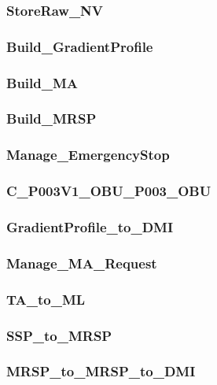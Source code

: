 \subsubsection{StoreRaw\_NV}


\subsubsection{Build\_GradientProfile}


\subsubsection{Build\_MA}


\subsubsection{Build\_MRSP}


\subsubsection{Manage\_EmergencyStop}


\subsubsection{C\_P003V1\_OBU\_P003\_OBU}


\subsubsection{GradientProfile\_to\_DMI}


\subsubsection{Manage\_MA\_Request}


\subsubsection{TA\_to\_ML}


\subsubsection{SSP\_to\_MRSP}


\subsubsection{MRSP\_to\_MRSP\_to\_DMI}


